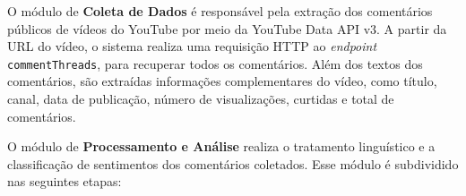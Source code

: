 \documentclass[
	12pt,				%
	openright,			%
	oneside,			%
	a4paper,			%
	english,			%
	brazil				%
	]{abntex2}
\begin{document}

O módulo de \textbf{Coleta de Dados} é responsável pela extração dos comentários públicos de vídeos do YouTube por meio da YouTube Data API v3. A partir da URL do vídeo, o sistema realiza uma requisição HTTP ao \textit{endpoint} \texttt{commentThreads}, para recuperar todos os comentários. Além dos textos dos comentários, são extraídas informações complementares do vídeo, como título, canal, data de publicação, número de visualizações, curtidas e total de comentários. 

O módulo de \textbf{Processamento e Análise} realiza o tratamento linguístico e a classificação de sentimentos dos comentários coletados. Esse módulo é subdividido nas seguintes etapas:
\end{document}
